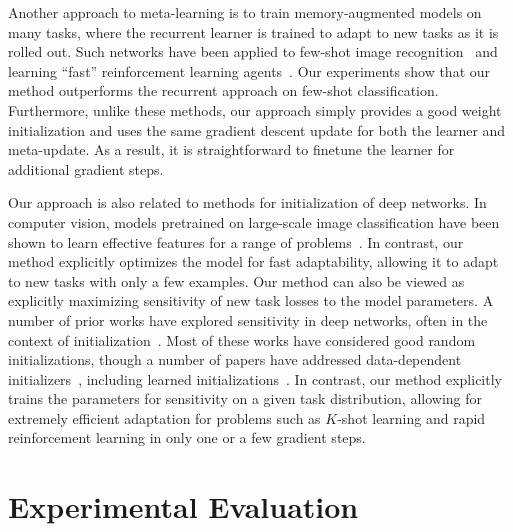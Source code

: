 \documentclass{article}
\begin{document}
Another approach to meta-learning is to train memory-augmented models on many tasks, where 
the recurrent learner is trained to adapt to new tasks as it is rolled out. Such networks have been applied to few-shot image recognition~\cite{mann,metanets} and learning ``fast'' reinforcement learning agents~\cite{rl2,learningrl}.
Our experiments show that our method outperforms the recurrent approach on few-shot classification. Furthermore, unlike these methods, our approach simply provides a good weight initialization and uses the same gradient descent update for both the learner and meta-update.
As a result, it is straightforward to finetune the learner for additional gradient steps.

Our approach is also related to methods for initialization of deep networks. %
In computer vision, models pretrained on large-scale image classification have been shown to learn effective features for a range of problems~\cite{decaf}. In contrast, our method explicitly optimizes the model for fast adaptability, allowing it to adapt to new tasks with only a few examples.
Our method can also be viewed as explicitly maximizing sensitivity of new task losses to the model parameters.
A number of prior works have explored sensitivity in deep networks, often in the context of initialization~\cite{orthogonal,forgetting}. Most of these works have considered good random initializations, though a number of papers have addressed data-dependent initializers~\cite{datadependentinit,weightnorm}, including learned initializations~\cite{husken,maclaurin}. In contrast, our method explicitly trains the parameters for sensitivity on a given task distribution, allowing for extremely efficient adaptation for problems such as $K$-shot learning and rapid reinforcement learning in only one or a few gradient steps.




\section{Experimental Evaluation}
\end{document}
